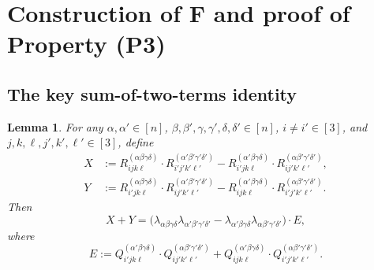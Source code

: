 \documentclass[12pt]{article}
\newtheorem{lemma}[theorem]{Lemma}
\begin{document}
\section{Construction of \texorpdfstring{$\mathbf{F}$}{F} and proof of Property (P3)}

\subsection{The key sum-of-two-terms identity}

\begin{lemma}\label{lem:sumXY}
For any $\alpha,\alpha'\in[n]$, $\beta,\beta',\gamma,\gamma',\delta,\delta'\in[n]$,
$i\neq i'\in[3]$, and $j,k,\ell,j',k',\ell'\in[3]$, define
\begin{align}
  X &:= R^{(\alpha\beta\gamma\delta)}_{ijk\ell}\cdot R^{(\alpha'\beta'\gamma'\delta')}_{i'j'k'\ell'}
        - R^{(\alpha'\beta\gamma\delta)}_{i'jk\ell}\cdot R^{(\alpha\beta'\gamma'\delta')}_{ij'k'\ell'},
  \label{eq:Xdef}\\
  Y &:= R^{(\alpha\beta\gamma\delta)}_{i'jk\ell}\cdot R^{(\alpha'\beta'\gamma'\delta')}_{ij'k'\ell'}
        - R^{(\alpha'\beta\gamma\delta)}_{ijk\ell}\cdot R^{(\alpha\beta'\gamma'\delta')}_{i'j'k'\ell'}.
  \label{eq:Ydef}
\end{align}
Then
\begin{equation}\label{eq:sumXY}
  X + Y
  = \bigl(\lambda_{\alpha\beta\gamma\delta}\lambda_{\alpha'\beta'\gamma'\delta'}
    - \lambda_{\alpha'\beta\gamma\delta}\lambda_{\alpha\beta'\gamma'\delta'}\bigr)
  \cdot E,
\end{equation}
where
\begin{equation}\label{eq:Edef}
  E := Q^{(\alpha'\beta\gamma\delta)}_{i'jk\ell}\cdot Q^{(\alpha\beta'\gamma'\delta')}_{ij'k'\ell'}
      + Q^{(\alpha'\beta\gamma\delta)}_{ijk\ell}\cdot Q^{(\alpha\beta'\gamma'\delta')}_{i'j'k'\ell'}.
\end{equation}
\end{lemma}
\end{document}
